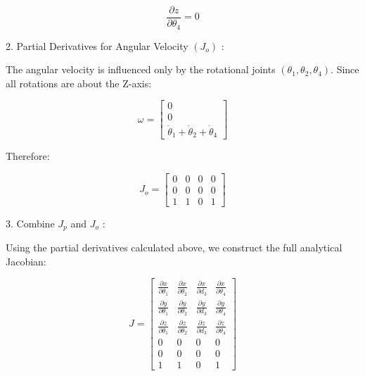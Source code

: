 \documentclass[12pt]{report}
\begin{document}
\begin{equation}
	\frac{\partial z}{\partial \theta_4} = 0
\end{equation}


2. Partial Derivatives for Angular Velocity $\left(J_o\right)$ :

The angular velocity is influenced only by the rotational joints $\left(\theta_1, \theta_2, \theta_4\right)$. Since all rotations are about the Z-axis:

\begin{equation}
	\omega = 
	\begin{bmatrix}
		0 \\
		0 \\
		\dot{\theta}_1 + \dot{\theta}_2 + \dot{\theta}_4
	\end{bmatrix}
\end{equation}



Therefore:

\begin{equation}
	J_o =
	\begin{bmatrix}
		0 & 0 & 0 & 0 \\
		0 & 0 & 0 & 0 \\
		1 & 1 & 0 & 1
	\end{bmatrix}
\end{equation}

3. Combine $J_p$ and $J_o$ :

Using the partial derivatives calculated above, we construct the full analytical Jacobian:

\begin{equation}
	J =
	\begin{bmatrix}
		\frac{\partial x}{\partial \theta_1} & \frac{\partial x}{\partial \theta_2} & \frac{\partial x}{\partial d_3} & \frac{\partial x}{\partial \theta_4} \\
		\frac{\partial y}{\partial \theta_1} & \frac{\partial y}{\partial \theta_2} & \frac{\partial y}{\partial d_3} & \frac{\partial y}{\partial \theta_4} \\
		\frac{\partial z}{\partial \theta_1} & \frac{\partial z}{\partial \theta_2} & \frac{\partial z}{\partial d_3} & \frac{\partial z}{\partial \theta_4} \\
		0 & 0 & 0 & 0 \\
		0 & 0 & 0 & 0 \\
		1 & 1 & 0 & 1
	\end{bmatrix}
\end{equation}
\end{document}

